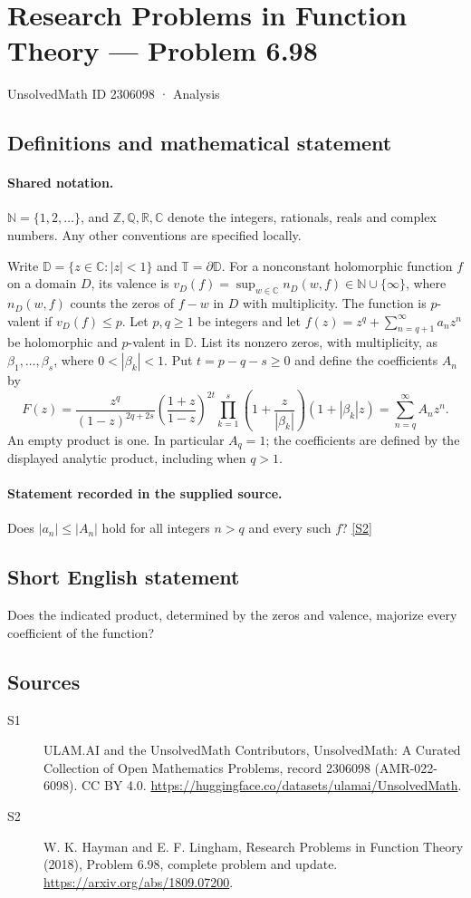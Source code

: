 \documentclass[11pt]{article}
\newcommand{\sref}[2]{\hyperlink{source:#1:#2}{[S#2]}}
\begin{document}
\setcounter{section}{2306097}
\section{Research Problems in Function Theory — Problem 6.98}\label{2306098}
{\small\sffamily UnsolvedMath ID 2306098 · Analysis}
\subsection{Definitions and mathematical statement}

\paragraph{Shared notation.}$\mathbb N=\{1,2,\ldots\}$, and $\mathbb Z,\mathbb Q,\mathbb R,\mathbb C$ denote the integers, rationals, reals and complex numbers. Any other conventions are specified locally.


Write $\mathbb D=\{z\in\mathbb C:|z|<1\}$ and $\mathbb T=\partial\mathbb D$. For a nonconstant holomorphic function $f$ on a domain $D$, its valence is $v_D(f)=\sup_{w\in\mathbb C}n_D(w,f)\in\mathbb N\cup\{\infty\}$, where $n_D(w,f)$ counts the zeros of $f-w$ in $D$ with multiplicity. The function is $p$-valent if $v_D(f)\leq p$. Let $p,q\geq1$ be integers and let $f(z)=z^q+\sum_{n=q+1}^{\infty}a_nz^n$ be holomorphic and $p$-valent in $\mathbb D$. List its nonzero zeros, with multiplicity, as $\beta_1,\ldots,\beta_s$, where $0<|\beta_k|<1$. Put $t=p-q-s\geq0$ and define the coefficients $A_n$ by
\[F(z)=\frac{z^q}{(1-z)^{2q+2s}}\left(\frac{1+z}{1-z}\right)^{2t}
\prod_{k=1}^{s}\left(1+\frac{z}{|\beta_k|}\right)(1+|\beta_k|z)
=\sum_{n=q}^{\infty}A_nz^n.\]
An empty product is one. In particular $A_q=1$; the coefficients are defined by the displayed analytic product, including when $q>1$.
\paragraph{Statement recorded in the supplied source.}
Does $|a_n|\leq|A_n|$ hold for all integers $n>q$ and every such $f$? \sref{2306098}{2}
\subsection{Short English statement}
Does the indicated product, determined by the zeros and valence, majorize every coefficient of the function?
\subsection{Sources}
\begin{description}
\item[\hypertarget{source:2306098:1}{S1}] ULAM.AI and the UnsolvedMath Contributors, UnsolvedMath: A Curated Collection of Open Mathematics Problems, record 2306098 (AMR-022-6098). CC BY 4.0. \url{https://huggingface.co/datasets/ulamai/UnsolvedMath}.
\item[\hypertarget{source:2306098:2}{S2}] W. K. Hayman and E. F. Lingham, Research Problems in Function Theory (2018), Problem 6.98, complete problem and update. \url{https://arxiv.org/abs/1809.07200}.
\end{description}
\label{end:2306098}
\end{document}
